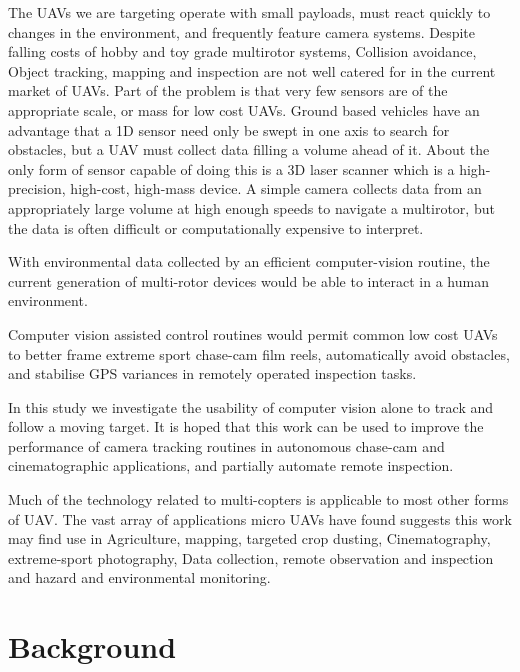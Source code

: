 \documentclass[a4paper, 11pt, titlepage]{article}
\begin{document}
      The UAVs we are targeting operate with small payloads, must react quickly to changes in the environment, and frequently feature camera systems.
      Despite falling costs of hobby and toy grade multirotor systems, Collision avoidance, Object tracking,   mapping and inspection are not well catered for in the current market of UAVs.
      Part of the problem is that very few sensors are of the appropriate scale, or mass for low cost UAVs.
      Ground based vehicles have an advantage that a 1D sensor need only be swept in one axis to search for obstacles, but a UAV must collect data filling a volume ahead of it. About the only form of sensor capable of doing this is a 3D laser scanner which is a high-precision, high-cost, high-mass device.
      A simple camera collects data from an appropriately large volume at high enough speeds to navigate a multirotor, but the data is often difficult or computationally expensive to interpret.

      With environmental data collected by an efficient computer-vision routine, the current generation of multi-rotor devices would be able to interact in a human environment.

      Computer vision assisted control routines would permit common low cost UAVs to better frame extreme sport chase-cam film reels, automatically avoid obstacles, and stabilise GPS variances in remotely operated inspection tasks.

      In this study we investigate the usability of computer vision alone to track and follow a moving target.  It is hoped that this work can be used to improve the performance of camera tracking routines in autonomous chase-cam and cinematographic applications, and partially automate remote inspection.

      Much of the technology related to multi-copters is applicable to most other forms of UAV.  The vast array of applications micro UAVs have found suggests this work may find use in Agriculture, mapping, targeted crop dusting, Cinematography, extreme-sport photography, Data collection, remote observation and inspection and hazard and environmental monitoring.
  \section{Background}
\end{document}
